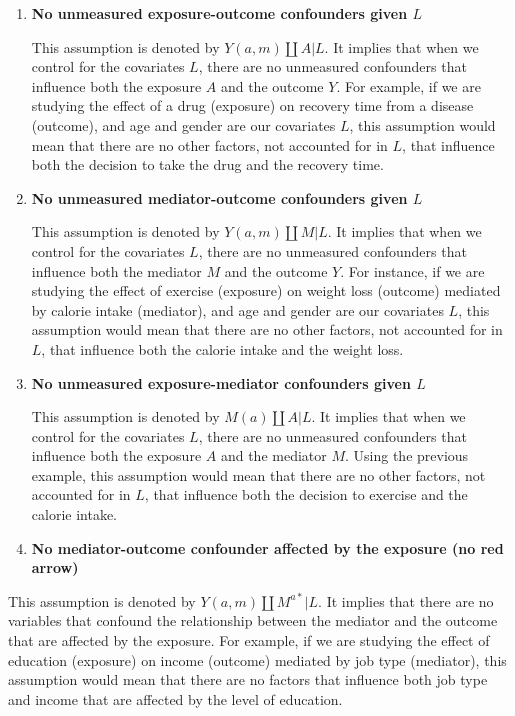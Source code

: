 \documentclass[
  singlecolumn]{report}
\begin{document}
\begin{enumerate}
\def\labelenumi{\arabic{enumi}.}
\item
  \textbf{No unmeasured exposure-outcome confounders given \(L\)}

  This assumption is denoted by \(Y(a,m) \coprod A | L\). It implies
  that when we control for the covariates \(L\), there are no unmeasured
  confounders that influence both the exposure \(A\) and the outcome
  \(Y\). For example, if we are studying the effect of a drug (exposure)
  on recovery time from a disease (outcome), and age and gender are our
  covariates \(L\), this assumption would mean that there are no other
  factors, not accounted for in \(L\), that influence both the decision
  to take the drug and the recovery time.
\item
  \textbf{No unmeasured mediator-outcome confounders given \(L\)}

  This assumption is denoted by \(Y(a,m) \coprod M | L\). It implies
  that when we control for the covariates \(L\), there are no unmeasured
  confounders that influence both the mediator \(M\) and the outcome
  \(Y\). For instance, if we are studying the effect of exercise
  (exposure) on weight loss (outcome) mediated by calorie intake
  (mediator), and age and gender are our covariates \(L\), this
  assumption would mean that there are no other factors, not accounted
  for in \(L\), that influence both the calorie intake and the weight
  loss.
\item
  \textbf{No unmeasured exposure-mediator confounders given \(L\)}

  This assumption is denoted by \(M(a) \coprod A | L\). It implies that
  when we control for the covariates \(L\), there are no unmeasured
  confounders that influence both the exposure \(A\) and the mediator
  \(M\). Using the previous example, this assumption would mean that
  there are no other factors, not accounted for in \(L\), that influence
  both the decision to exercise and the calorie intake.
\item
  \textbf{No mediator-outcome confounder affected by the exposure (no
  red arrow)}
\end{enumerate}

This assumption is denoted by \(Y(a,m) \coprod M^{a*} | L\). It implies
that there are no variables that confound the relationship between the
mediator and the outcome that are affected by the exposure. For example,
if we are studying the effect of education (exposure) on income
(outcome) mediated by job type (mediator), this assumption would mean
that there are no factors that influence both job type and income that
are affected by the level of education.
\end{document}
